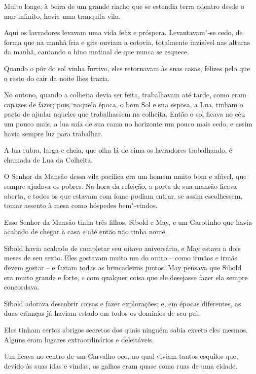  

Muito longe, à beira de um grande riacho que se estendia terra adentro
desde o mar infinito, havia uma tranquila vila.

Aqui os lavradores levavam uma vida feliz e próspera. Levantavam"-se
cedo, de forma que na manhã fria e gris ouviam a cotovia, totalmente
invisível nas alturas da manhã, cantando o hino matinal de que nunca se
esquece.

Quando o pôr do sol vinha furtivo, eles retornavam às suas casas,
felizes pelo que o resto do cair da noite lhes trazia.

No outono, quando a colheita devia ser feita, trabalhavam até tarde,
como eram capazes de fazer; pois, naquela época, o bom Sol e sua esposa,
a Lua, tinham o pacto de ajudar aqueles que trabalhassem na colheita.
Então o sol ficava no céu um pouco mais, a lua saía de sua cama no
horizonte um pouco mais cedo, e assim havia sempre luz para trabalhar.

A lua rubra, larga e cheia, que olha lá de cima os lavradores
trabalhando, é chamada de Lua da Colheita.

O Senhor da Mansão dessa vila pacífica era um homem muito bom e afável,
que sempre ajudava os pobres. Na hora da refeição, a porta de sua mansão
ficava aberta, e todos os que estavam com fome podiam entrar, se assim
escolhessem, tomar assento à mesa como hóspedes bem"-vindos.

Esse Senhor da Mansão tinha três filhos, Sibold e May, e um Garotinho
que havia acabado de chegar à casa e até então não tinha nome.

Sibold havia acabado de completar seu oitavo aniversário, e May estava a
dois meses de seu sexto. Eles gostavam muito um do outro -- como irmãos
e irmãs devem gostar -- e faziam todas as brincadeiras juntos. May
pensava que Sibold era muito grande e forte, e com qualquer coisa que
ele desejasse fazer ela sempre concordava.

Sibold adorava descobrir coisas e fazer explorações; e, em épocas
diferentes, as duas crianças já haviam estado em todos os domínios de
seu pai.

Eles tinham certos abrigos secretos dos quais ninguém sabia exceto eles
mesmos. Alguns eram lugares extraordinários e deleitáveis.

Um ficava no centro de um Carvalho oco, no qual viviam tantos esquilos
que, devido às suas idas e vindas, os galhos eram quase como ruas de uma
cidade.

